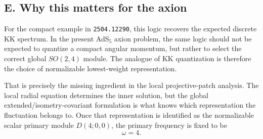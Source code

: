 \documentclass[12pt]{article}
\begin{document}
\subsection*{E. Why this matters for the axion}

For the compact example in \texttt{2504.12290}, this logic recovers the expected discrete KK spectrum.  In
the present AdS$_5$ axion problem, the same logic should not be expected to quantize a compact angular
momentum, but rather to select the correct global $SO(2,4)$ module.  The analogue of KK quantization is
therefore the choice of normalizable lowest-weight representation.

That is precisely the missing ingredient in the local projective-patch analysis.  The local radial
equation determines the inner solution, but the global extended/isometry-covariant formulation is what
knows which representation the fluctuation belongs to.  Once that representation is identified as the
normalizable scalar primary module $D(4;0,0)$, the primary frequency is fixed to be
\begin{equation}
\omega=4.
\end{equation}
\end{document}

